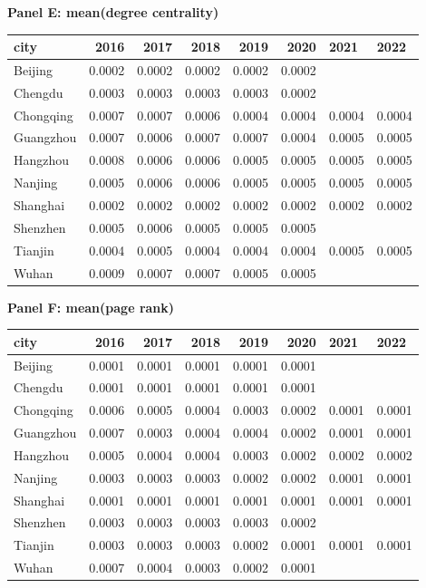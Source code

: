 \textbf{Panel E: mean(degree centrality)}\\
\begin{tabular}{lrrrrrll}
\hline
 city      &   2016 &   2017 &   2018 &   2019 &   2020 & 2021   & 2022   \\
\hline
 Beijing   & 0.0002 & 0.0002 & 0.0002 & 0.0002 & 0.0002 &        &        \\
 Chengdu   & 0.0003 & 0.0003 & 0.0003 & 0.0003 & 0.0002 &        &        \\
 Chongqing & 0.0007 & 0.0007 & 0.0006 & 0.0004 & 0.0004 & 0.0004 & 0.0004 \\
 Guangzhou & 0.0007 & 0.0006 & 0.0007 & 0.0007 & 0.0004 & 0.0005 & 0.0005 \\
 Hangzhou  & 0.0008 & 0.0006 & 0.0006 & 0.0005 & 0.0005 & 0.0005 & 0.0005 \\
 Nanjing   & 0.0005 & 0.0006 & 0.0006 & 0.0005 & 0.0005 & 0.0005 & 0.0005 \\
 Shanghai  & 0.0002 & 0.0002 & 0.0002 & 0.0002 & 0.0002 & 0.0002 & 0.0002 \\
 Shenzhen  & 0.0005 & 0.0006 & 0.0005 & 0.0005 & 0.0005 &        &        \\
 Tianjin   & 0.0004 & 0.0005 & 0.0004 & 0.0004 & 0.0004 & 0.0005 & 0.0005 \\
 Wuhan     & 0.0009 & 0.0007 & 0.0007 & 0.0005 & 0.0005 &        &        \\
\hline
\end{tabular}

\textbf{Panel F: mean(page rank)}\\
\begin{tabular}{lrrrrrll}
\hline
 city      &   2016 &   2017 &   2018 &   2019 &   2020 & 2021   & 2022   \\
\hline
 Beijing   & 0.0001 & 0.0001 & 0.0001 & 0.0001 & 0.0001 &        &        \\
 Chengdu   & 0.0001 & 0.0001 & 0.0001 & 0.0001 & 0.0001 &        &        \\
 Chongqing & 0.0006 & 0.0005 & 0.0004 & 0.0003 & 0.0002 & 0.0001 & 0.0001 \\
 Guangzhou & 0.0007 & 0.0003 & 0.0004 & 0.0004 & 0.0002 & 0.0001 & 0.0001 \\
 Hangzhou  & 0.0005 & 0.0004 & 0.0004 & 0.0003 & 0.0002 & 0.0002 & 0.0002 \\
 Nanjing   & 0.0003 & 0.0003 & 0.0003 & 0.0002 & 0.0002 & 0.0001 & 0.0001 \\
 Shanghai  & 0.0001 & 0.0001 & 0.0001 & 0.0001 & 0.0001 & 0.0001 & 0.0001 \\
 Shenzhen  & 0.0003 & 0.0003 & 0.0003 & 0.0003 & 0.0002 &        &        \\
 Tianjin   & 0.0003 & 0.0003 & 0.0003 & 0.0002 & 0.0001 & 0.0001 & 0.0001 \\
 Wuhan     & 0.0007 & 0.0004 & 0.0003 & 0.0002 & 0.0001 &        &        \\
\hline
\end{tabular}

